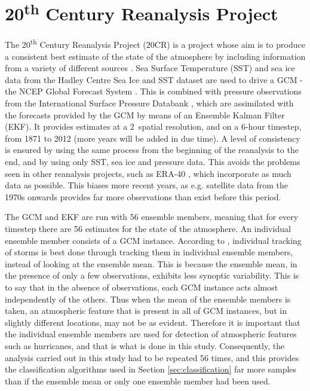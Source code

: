 \documentclass[pdftex,12pt,a4paper]{report}
\newcommand{\ts}{\textsuperscript}
\begin{document}
\section{20\ts{th} Century Reanalysis Project}
\label{sec:20crp}
The 20\ts{th} Century Reanalysis Project (20CR) is a project whose aim is to produce a consistent
best estimate of the state of the atmosphere by including information from a variety of different
sources \parencite{compoTwentieth2011}. Sea Surface Temperature (SST) and
sea ice data from the Hadley Centre Sea Ice and SST dataset \parencite{rayner2003global} are used to drive
a GCM - the NCEP Global Forecast System \parencite{kanamitsu1989description}.
This is combined with pressure observations from the International Surface Pressure Databank
\parencite{yin2008international}, which are assimilated with the forecasts provided by the GCM by
means of an Ensemble Kalman Filter (EKF). It provides estimates at a 2\textdegree\ spatial
resolution, and on a 6-hour timestep, from 1871 to 2012 (more years will be added in due time). A
level of consistency is ensured by using the same process from the beginning of the reanalysis to
the end, and by using only SST, sea ice and pressure data. This avoids the problems seen in other
reanalysis projects, such as ERA-40 \parencite{uppala2005era}, which incorporate as much data as
possible. This biases more recent years, as e.g. satellite data from the 1970s onwards provides far
more observations than exist before this period. 


The GCM and EKF are run with 56 ensemble members, meaning that for every timestep there are 56
estimates for the state of the atmosphere. An individual ensemble member consists of a GCM instance.
According to \textcite{compoTwentieth2011}, individual tracking of storms is best done through
tracking them in individual ensemble members, instead of looking at the ensemble mean. This is
because the ensemble mean, in the presence of only a few observations, exhibits less synoptic
variability. This is to say that in the absence of observations, each GCM instance acts almost
independently of the others. Thus when the mean of the ensemble members is taken, an atmospheric
feature that is present in all of GCM instances, but in slightly different locations, may not be as
evident. Therefore it is important that the individual ensemble members are used for detection of
atmospheric features such as hurricanes, and that is what is done in this study. Consequently, the
analysis carried out in this study had to be repeated 56 times, and this provides the classification
algorithms used in Section \ref{sec:classification} far more samples than if the ensemble mean or
only one ensemble member had been used. 
\end{document}
